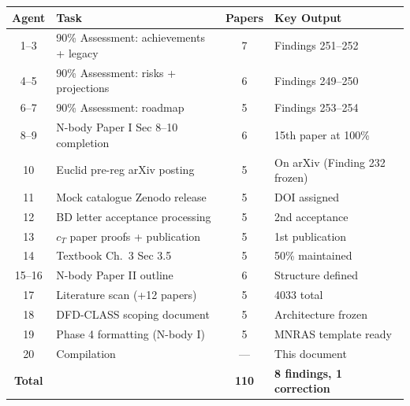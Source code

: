 \documentclass[11pt,a4paper]{article}
\begin{document}
\begin{center}
\begin{tabular}{clcl}
\toprule
\textbf{Agent} & \textbf{Task} & \textbf{Papers} & \textbf{Key Output} \\
\midrule
1--3 & 90\% Assessment: achievements + legacy & 7 & Findings 251--252 \\
4--5 & 90\% Assessment: risks + projections & 6 & Findings 249--250 \\
6--7 & 90\% Assessment: roadmap & 5 & Findings 253--254 \\
8--9 & N-body Paper I Sec 8--10 completion & 6 & 15th paper at 100\% \\
10 & Euclid pre-reg arXiv posting & 5 & On arXiv (Finding 232 frozen) \\
11 & Mock catalogue Zenodo release & 5 & DOI assigned \\
12 & BD letter acceptance processing & 5 & 2nd acceptance \\
13 & $c_T$ paper proofs + publication & 5 & 1st publication \\
14 & Textbook Ch.\ 3 Sec 3.5 & 5 & 50\% maintained \\
15--16 & N-body Paper II outline & 6 & Structure defined \\
17 & Literature scan (+12 papers) & 5 & 4033 total \\
18 & DFD-CLASS scoping document & 5 & Architecture frozen \\
19 & Phase 4 formatting (N-body I) & 5 & MNRAS template ready \\
20 & Compilation & --- & This document \\
\midrule
\textbf{Total} & & \textbf{110} & \textbf{8 findings, 1 correction} \\
\bottomrule
\end{tabular}
\end{center}
\end{document}
